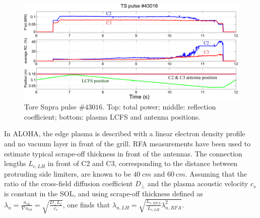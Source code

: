\begin{figure}[h]
	\includegraphics{figures/chap2/Tore_Supra/TS43016}
	\caption{Tore Supra pulse $\#43016$. Top: total power; middle: reflection coefficient; bottom: plasma LCFS and antenna positions.}
	\label{fig:TS43016}
\end{figure}


In ALOHA, the edge plasma is described with a linear electron density profile and no vacuum layer in front of the grill. RFA measurements have been used to estimate typical scrape-off thickness in front of the antennas\cite{kocan2008-1}. The connection lengths $L_{c,LH}$ in front of C2 and C3, corresponding to the distance between protruding side limiters, are known to be $40~\si{cm}$ and $60~\si{cm}$. Assuming that the ratio of the cross-field diffusion coefficient $D_\perp$ and the plasma acoustic velocity $c_s$ is constant in the SOL, and using scrape-off thickness defined as $\lambda_n=\frac{n_{e0}}{\nabla n_{e0}}=\sqrt{\frac{D_\perp L_c}{c_s}}$, one finds that $\lambda_{n,LH}=\sqrt{\frac{L_{c,RFA}}{L_{c,LH}}\lambda_{n,RFA}^2}$. 



